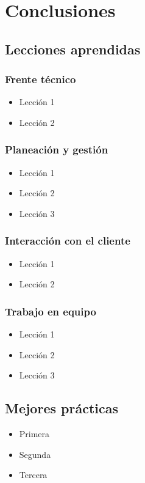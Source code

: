 \chapter{Conclusiones}
\label{chapter:conclusions}

\section{Lecciones aprendidas}
\label{section:lecciones-aprendidas}
\blindtext

\subsection{Frente técnico}
\begin{itemize}
  \item Lección 1
  \item Lección 2
\end{itemize}

\subsection{Planeación y gestión}
\begin{itemize}
  \item Lección 1
  \item Lección 2
  \item Lección 3
\end{itemize}

\subsection{Interacción con el cliente}
\begin{itemize}
  \item Lección 1
  \item Lección 2

\end{itemize}

\subsection{Trabajo en equipo}
\begin{itemize}
  \item Lección 1
  \item Lección 2
  \item Lección 3
\end{itemize}

\section{Mejores prácticas}
\label{section:mejores-practicas}
\begin{itemize}
  \item Primera
  \item Segunda
  \item Tercera
\end{itemize}
